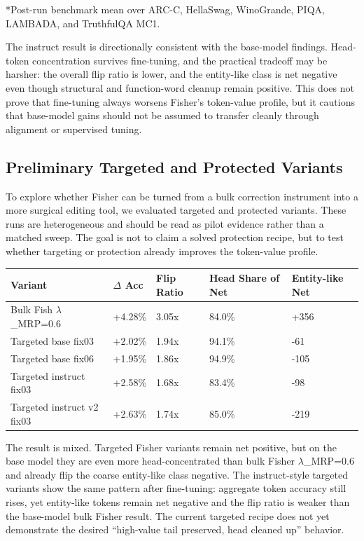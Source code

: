 \documentclass[
  11pt,
]{article}
\begin{document}
*Post-run benchmark mean over ARC-C, HellaSwag, WinoGrande, PIQA,
LAMBADA, and TruthfulQA MC1.

The instruct result is directionally consistent with the base-model
findings. Head-token concentration survives fine-tuning, and the
practical tradeoff may be harsher: the overall flip ratio is lower, and
the entity-like class is net negative even though structural and
function-word cleanup remain positive. This does not prove that
fine-tuning always worsens Fisher's token-value profile, but it cautions
that base-model gains should not be assumed to transfer cleanly through
alignment or supervised tuning.

\hypertarget{preliminary-targeted-and-protected-variants}{%
\subsection{Preliminary Targeted and Protected
Variants}\label{preliminary-targeted-and-protected-variants}}

To explore whether Fisher can be turned from a bulk correction
instrument into a more surgical editing tool, we evaluated targeted and
protected variants. These runs are heterogeneous and should be read as
pilot evidence rather than a matched sweep. The goal is not to claim a
solved protection recipe, but to test whether targeting or protection
already improves the token-value profile.

\begin{longtable}[]{@{}lllll@{}}
\toprule\noalign{}
Variant & $\Delta$ Acc & Flip Ratio & Head Share of Net & Entity-like Net \\
\midrule\noalign{}
\endhead
\bottomrule\noalign{}
\endlastfoot
Bulk Fish $\lambda$\_MRP=0.6 & +4.28\% & 3.05x & 84.0\% & +356 \\
Targeted base fix03 & +2.02\% & 1.94x & 94.1\% & -61 \\
Targeted base fix06 & +1.95\% & 1.86x & 94.9\% & -105 \\
Targeted instruct fix03 & +2.58\% & 1.68x & 83.4\% & -98 \\
Targeted instruct v2 fix03 & +2.63\% & 1.74x & 85.0\% & -219 \\
\end{longtable}

The result is mixed. Targeted Fisher variants remain net positive, but
on the base model they are even more head-concentrated than bulk Fisher
$\lambda$\_MRP=0.6 and already flip the coarse entity-like class negative. The
instruct-style targeted variants show the same pattern after
fine-tuning: aggregate token accuracy still rises, yet entity-like
tokens remain net negative and the flip ratio is weaker than the
base-model bulk Fisher result. The current targeted recipe does not yet
demonstrate the desired ``high-value tail preserved, head cleaned up''
behavior.
\end{document}
